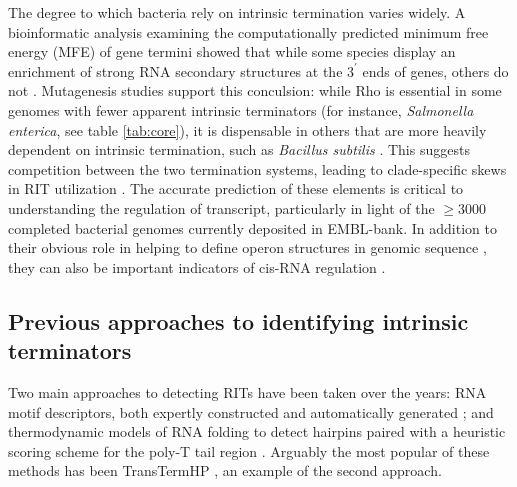The degree to which bacteria rely on intrinsic termination varies widely. A bioinformatic analysis examining the computationally predicted minimum free energy (MFE) of gene termini showed that while some species display an enrichment of strong RNA secondary structures at the $3^\prime$ ends of genes, others do not \parencite{Washio1998}. Mutagenesis studies support this conculsion: while Rho is essential in some genomes with fewer apparent intrinsic terminators (for instance, \textit{Salmonella enterica}, see table \ref{tab:core}), it is dispensable in others that are more heavily dependent on intrinsic termination, such as \textit{Bacillus subtilis} \parencite{Quirk1993}. This suggests competition between the two termination systems, leading to clade-specific skews in RIT utilization \parencite{Carafa1990, Kroger1998, Hoon2005}. The accurate prediction of these elements is critical to understanding the regulation of transcript, particularly in light of the $\ge$3000 completed bacterial genomes currently deposited in EMBL-bank. In addition to their obvious role in helping to define operon structures in genomic sequence \parencite{Salgado2013}, they can also be important indicators of cis-RNA regulation \parencite{Henkin2002, Barrick2007, Naville2010}.

\subsection{Previous approaches to identifying intrinsic terminators}

Two main approaches to detecting RITs have been taken over the years: RNA motif descriptors, both expertly constructed \parencite{Lesnik2001} and automatically generated \parencite{Naville2011}; and thermodynamic models of RNA folding to detect hairpins paired with a heuristic scoring scheme for the poly-T tail region \parencite{Ermolaeva2000, Wan2005, Wan2006, Kingsford2007}. Arguably the most popular of these methods has been TransTermHP \parencite{Kingsford2007}, an example of the second approach.

